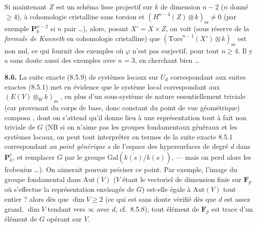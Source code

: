 \documentclass[11pt,a4paper]{article}
\begin{document}
Si maintenant $Z$ est un schéma lisse projectif sur $k$ de dimension
$n - 2$ ($n$ donné $\geq 4$), à cohomologie cristalline sans torsion et
$(H^{n-4}(Z) \otimes k)_{\mathrm{ss}} \neq 0$ (par exemple
$\mathbf{P}^{n-2}_{k}$ si $n$ pair \ldots{}), alors, posant $X' = X \times Z$, on
voit (sous réserve de la \emph{formule de Kunneth} en cohomologie cristalline)
que $(\mathrm{Tors}^{n-1}(X') \otimes k)_{\mathrm{ss}}$ est non nul, ce qui
fournit des exemples où $\varphi$ n'est pas surjectif, pour tout $n \geq 4$. Il
y a sans doute aussi des exemples avec $n = 3$, en cherchant bien \ldots{}


\textbf{8.6.} La suite exacte (8.5.9) de systèmes locaux sur $U_{d}$
correspondant aux suites exactes (8.5.1) met en évidence que le système local
correspondant aux $(E(Y) \otimes_{W} k)_{\mathrm{ss}}$  , en plus d'un sous-système
  de nature essentiellement
triviale (car provenant du corps de base, donc constant du point de vue
géométrique)  composa  ,
dont on s'attend qu'il donne lieu à une représentation tout à fait non triviale
de $G$ (NB si on n'aime pas les groupes fondamentaux généraux et les systèmes
locaux, on peut tout interpréter en termes de la suite exacte 8.5.1
correspondant au \emph{point générique} $s$ de l'espace des hypersurfaces de
degré $d$ dans $\mathbf{P}^{r}_{k}$, et remplacer $G$ par le groupe
$\mathrm{Gal}(\overline{k(s)}/k(s))$, --- mais on perd alors les frobenius
\ldots{}). On aimerait pouvoir préciser ce point. Par exemple,  l'image du groupe
fondamental  dans $\mathrm{Aut}(V)$ ($V$ étant le vectoriel de
dimension finie sur $\mathbf{F}_{p}$ où s'effectue la représentation envisagée
de $G$) est-elle égale à $\mathrm{Aut}(V)$ tout entier ?\add{)}
 alors dès que  $\dim V \geq 2$ (ce qui est sans
doute vérifié dès que $d$ est assez grand, $\dim V$ tendant vers $\infty$ avec
$d$, cf.\ 8.5.8), tout élément de $\mathbf{F}_{p}$ est trace d'un élément de
$G$ opérant sur $V$.
\end{document}
